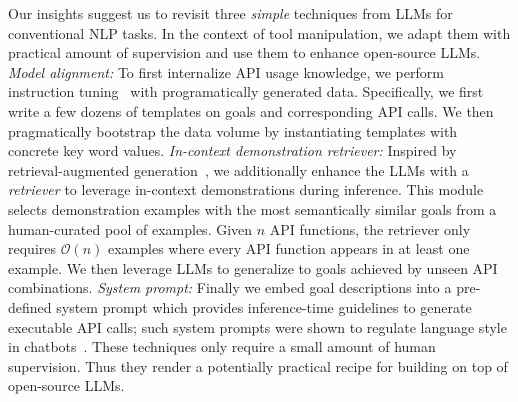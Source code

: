 Our insights suggest us to revisit three \emph{simple} techniques from LLMs for conventional NLP tasks.
In the context of tool manipulation, 
we adapt them with practical amount of supervision and use them to enhance open-source LLMs.
\emph{Model alignment:} To first internalize API usage knowledge, we perform instruction tuning~\cite{ouyang2022training,bai2022constitutional} with programatically generated data. Specifically, we first write a few dozens of templates on goals and corresponding API calls. We then pragmatically bootstrap the data volume by instantiating templates with concrete key word values.
\emph{In-context demonstration retriever:} Inspired by retrieval-augmented generation~\cite{borgeaud2022improving,li2022survey,ram2023context}, we additionally enhance the LLMs with a \emph{retriever} to leverage in-context demonstrations during inference. This module selects demonstration examples with the most semantically similar goals from a human-curated pool of examples. Given $n$ API functions, the retriever only requires $\mathcal{O}\left(n\right)$ examples where every API function appears in at least one example. We then leverage LLMs to generalize to goals achieved by unseen API combinations. 
\emph{System prompt:} Finally we embed goal descriptions into a pre-defined system prompt which provides inference-time guidelines to  generate executable API calls; such system prompts were shown to regulate language style in chatbots~\cite{glaese2022improving}. 
These techniques only require a small amount of human supervision. Thus they render a potentially practical recipe for building on top of open-source LLMs.

